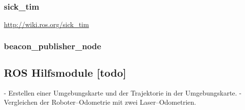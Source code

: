 \subsubsection{sick\_tim}


\url{http://wiki.ros.org/sick_tim}


\begin{comment}
--------------------------------------------------------------------------------
pub = rospy.Publisher('beacon', ObservationRangeBeacon, queue_size=10)
pub_raw = rospy.Publisher('beacon_raw', Beacon, queue_size=10)

antenna_delay = rospy.get_param('~antenna_delay', 16450)
sensor_frame_id = rospy.get_param('~sensor_frame_id', 'uwb_reciever_link')
serial_port = rospy.get_param('~serial_port', '/dev/CP2104_Friend')
\end{comment}
\subsubsection{beacon\_publisher\_node}




\begin{comment}
--------------------------------------------------------------------------------
\end{comment}
\subsection{ROS Hilfsmodule [todo]}

- Erstellen einer Umgebungskarte und der Trajektorie in der Umgebungskarte.
- Vergleichen der Roboter--Odometrie mit zwei Laser--Odometrien.


\begin{comment}
--------------------------------------------------------------------------------
<node pkg="hector_mapping" type="hector_mapping" name="hector_mapping" output="screen">
  <param name="scan_topic" value="scan" />
  <param name="base_frame" value="base_link" />
  <param name="odom_frame" value="odom" />
  <param name="map_frame" value="map" />

  <param name="pub_map_odom_transform" value="true" />

  <param name="map_resolution" value="0.02" />
  <param name="laser_min_dist" value="0.05" />
	<param name="laser_max_dist" value="30.0" />
</node>
- \url{http://wiki.ros.org/hector_mapping}
- hector_mapping is a SLAM approach that can be used without odometry as well as on platforms that exhibit roll/pitch motion (of the sensor, the platform or both). It leverages the high update rate of modern LIDAR systems like the Hokuyo UTM-30LX and provides 2D pose estimates at scan rate of the sensors (40Hz for the UTM-30LX). While the system does not provide explicit loop closing ability, it is sufficiently accurate for many real world scenarios. The system has successfully been used on Unmanned Ground Robots, Unmanned Surface Vehicles, Handheld Mapping Devices and logged data from quadrotor UAVs.
- Bild vom OccupanyGrid
\end{comment}
